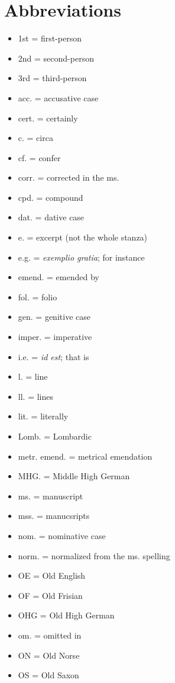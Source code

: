 \thispagestyle{empty}\section{Abbreviations}
  \begin{itemize}
    \item 1st = first-person
    \item 2nd = second-person
    \item 3rd = third-person
    \item acc. = accusative case
    \item cert. = certainly
    \item c. = circa
    \item cf. = confer
    \item corr. = corrected in the ms.
    \item cpd. = compound
    \item dat. = dative case
    \item e. = excerpt (not the whole stanza)
    \item e.g. = \emph{exemplio gratia}; for instance
    \item emend. = emended by
    \item fol. = folio
    \item gen. = genitive case
    \item imper. = imperative
    \item i.e. = \emph{id est}; that is
    \item l. = line
    \item ll. = lines
    \item lit. = literally
    \item Lomb. = Lombardic
    \item metr. emend. = metrical emendation
    \item MHG. = Middle High German
    \item ms. = manuscript
    \item mss. = manucsripts
    \item nom. = nominative case
    \item norm. = normalized from the ms. spelling
    \item OE = Old English
    \item OF = Old Frisian
    \item OHG = Old High German
    \item om. = omitted in
    \item ON = Old Norse
    \item OS = Old Saxon

\end{itemize}
